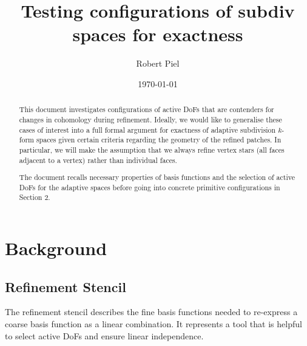 \documentclass[12pt, a4paper]{article}
\title{Testing configurations of subdiv spaces for exactness}
\author{Robert Piel}
\date{\today}
\numberwithin{equation}{section}
\begin{document}
\maketitle

\begin{abstract}
    This document investigates configurations of active DoFs that are contenders for changes in cohomology during refinement. Ideally, we would like to generalise these cases of interest into a full formal argument for exactness of adaptive subdivision $k$-form spaces given certain criteria regarding the geometry of the refined patches. In particular, we will make the assumption that we always refine vertex stars (all faces adjacent to a vertex) rather than individual faces.

    The document recalls necessary properties of basis functions and the selection of active DoFs for the adaptive spaces before going into concrete primitive configurations in Section 2.
\end{abstract}

\section{Background}

\subsection{Refinement Stencil}

The refinement stencil describes the fine basis functions needed to re-express a coarse basis function as a linear combination. It represents a tool that is helpful to select active DoFs and ensure linear independence.
\end{document}

